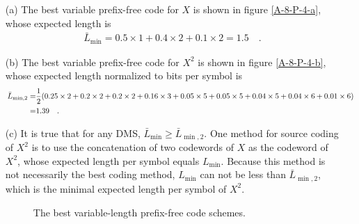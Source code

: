 \documentclass{assignment}
\begin{document}
\begin{sol}
    \begin{itemize}
        \item[(a)] The best variable prefix-free code for $X$ is shown in figure \ref{A-8-P-4-a}, whose expected length is
        \begin{align}
            \bar{L}_{\min}=0.5\times 1+0.4\times 2+0.1\times 2=1.5\quad.
        \end{align}
        \item[(b)] The best variable prefix-free code for $X^2$ is shown in figure \ref{A-8-P-4-b}, whose expected length normalized to bits per symbol is
        \begin{align}
            \notag\bar{L}_{\min,2}=&\frac{1}{2}(0.25\times 2+0.2\times 2+0.2\times 2+0.16\times 3+0.05\times 5+0.05\times 5+0.04\times 5+0.04\times 6+0.01\times 6)\\
            =&1.39\quad.
        \end{align}
        \item[(c)] It is true that for any DMS, $\bar{L}_{\min}\geq\bar{L}_{\min,2}$. One method for source coding of $X^2$ is to use the concatenation of two codewords of $X$ as the codeword of $X^2$, whose expected length per symbol equals $L_{\min}$. Because this method is not necessarily the best coding method, $L_{\min}$ can not be less than $\bar{L}_{\min,2}$, which is the minimal expected length per symbol of $X^2$.
        \begin{figure}[h]
            \centering
            \caption{The best variable-length prefix-free code schemes.}
        \end{figure}
    \end{itemize}
\end{sol}
\end{document}

